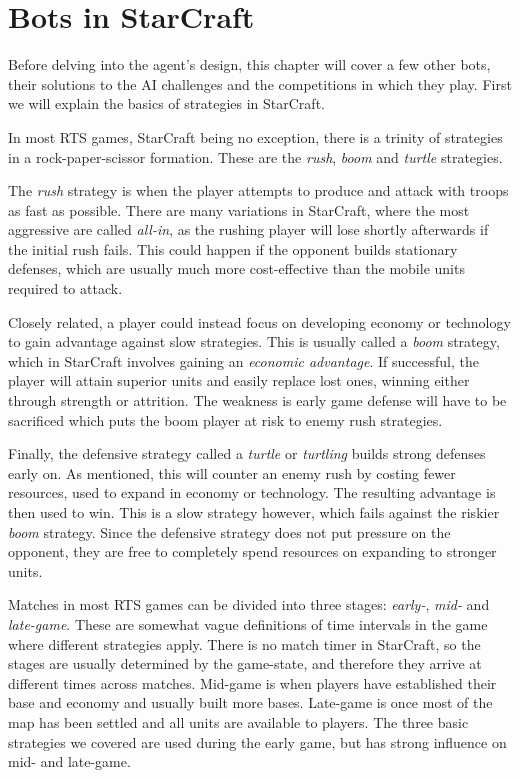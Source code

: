 \chapter{Bots in StarCraft}
Before delving into the agent's design, this chapter will cover a few other bots, their solutions to the AI challenges and the competitions in which they play. First we will explain the basics of strategies in StarCraft.

In most RTS games, StarCraft being no exception, there is a trinity of strategies in a rock-paper-scissor formation. These are the \emph{rush}, \emph{boom} and \emph{turtle} strategies.

The \emph{rush} strategy is when the player attempts to produce and attack with troops as fast as possible. There are many variations in StarCraft, where the most aggressive are called \emph{all-in}, as the rushing player will lose shortly afterwards if the initial rush fails. This could happen if the opponent builds stationary defenses, which are usually much more cost-effective than the mobile units required to attack.

Closely related, a player could instead focus on developing economy or technology to gain advantage against slow strategies. This is usually called a \emph{boom} strategy, which in StarCraft involves gaining an \emph{economic advantage}. If successful, the player will attain superior units and easily replace lost ones, winning either through strength or attrition. The weakness is early game defense will have to be sacrificed which puts the boom player at risk to enemy rush strategies.

Finally, the defensive strategy called a \emph{turtle} or \emph{turtling} builds strong defenses early on. As mentioned, this will counter an enemy rush by costing fewer resources, used to expand in economy or technology. The resulting advantage is then used to win. This is a slow strategy however, which fails against the riskier \emph{boom} strategy. Since the defensive strategy does not put pressure on the opponent, they are free to completely spend resources on expanding to stronger units.

Matches in most RTS games can be divided into three stages: \emph{early-}, \emph{mid-} and \emph{late-game}. These are somewhat vague definitions of time intervals in the game where different strategies apply. There is no match timer in StarCraft, so the stages are usually determined by the game-state, and therefore they arrive at different times across matches. Mid-game is when players have established their base and economy and usually built more bases. Late-game is once most of the map has been settled and all units are available to players. The three basic strategies we covered are used during the early game, but has strong influence on mid- and late-game.

